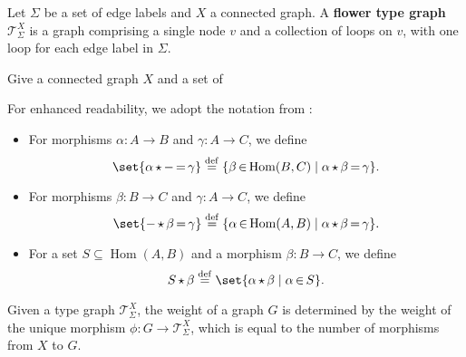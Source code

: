 \begin{definition}
    \label{def:t_sigm_x}
    Let $\Sigma$ be a set of edge labels and \( X \) a connected graph.
    A \textbf{flower type graph} \( \mathcal{T}_\Sigma^X \) is a graph comprising a single node \( v \) and a collection of loops on \( v \), with one loop for each edge label in \( \Sigma \).
\end{definition}
Give a connected graph $X$ and a set of 

\begin{remark}[Notation]
    For enhanced readability, we adopt the notation from \cite[Notation 3.3]{endrullis2023generalized}:
    \begin{itemize}
        \item For morphisms \( \alpha : A \mathop{\to} B \) and \( \gamma : A \mathop{\to} C \), we define
        \[
            \set{ \alpha \mathop{\star} - \mathop{=} \gamma } \overset{\operatorname{def}}{=} \{ \beta \mathop{\in} \operatorname{Hom}(B, C) \mid \alpha \mathop{\star} \beta \mathop{=} \gamma \}.
        \]
        \item For morphisms \( \beta : B \mathop{\to} C \) and \( \gamma : A \mathop{\to} C \), we define
        \[
            \set{ - \mathop{\star} \beta \mathop{=} \gamma } \overset{\operatorname{def}}{=} \{ \alpha \mathop{\in} \operatorname{Hom}(A, B) \mid \alpha \mathop{\star} \beta \mathop{=} \gamma \}.
        \]
        \item For a set \( S \mathop{\subseteq} \operatorname{Hom}(A, B) \) and a morphism \( \beta : B \mathop{\to} C \), we define
        \[
            S \mathop{\star} \beta \overset{\operatorname{def}}{=} \set{ \alpha \mathop{\star} \beta \mid \alpha \mathop{\in} S }.
        \]
    \end{itemize}
\end{remark}

Given a type graph \( \mathcal{T}_\Sigma^X\), the weight of a graph \( G \) is determined by the weight of the unique morphism \( \phi : G \mathop{\to} \mathcal{T}_\Sigma^X\), which is equal to the number of morphisms from \( X \) to \( G \).

